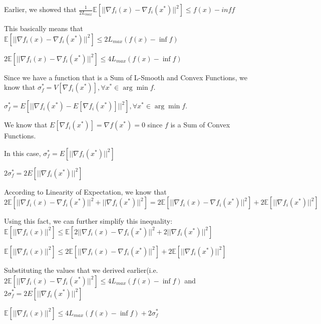 Earlier, we showed that $\frac{1}{2L_{max}} \mathbb{E}[||\nabla f_i(x) - \nabla f_i(x^*)||^2] \leq f(x) - inf f$ \newline 

This basically means that $\mathbb{E}[||\nabla f_i(x) - \nabla f_i(x^*)||^2] \leq 2L_{max} (f(x) - \inf f)$ \newline 

$2\mathbb{E}[||\nabla f_i(x) - \nabla f_i(x^*)||^2] \leq 4L_{max} (f(x) - \inf f)$

Since we have a function that is a Sum of L-Smooth and Convex Functions, we know that \newline 
\noindent $\sigma_f^* = V[\nabla f_i(x^*)], \forall x^* \in \arg \min f.$ \newline 

\noindent $\sigma_f^* = E[||\nabla f_i(x^*) - E[\nabla f_i(x^*)]||^2], \forall x^* \in \arg \min f.$ \newline 

We know that $E[\nabla f_i(x^*)] = \nabla f(x^*) = 0$ since $f$ is a Sum of Convex Functions. \newline 

In this case, 
\noindent $\sigma_f^* = E[||\nabla f_i(x^*)||^2]$ \newline 

$2 \sigma_f^* = 2 E[||\nabla f_i(x^*)||^2]$ \newline 

According to Linearity of Expectation, we know that \newline 
$2\mathbb{E} [||\nabla f_i(x) - \nabla f_i(x^*)||^2 + ||\nabla f_i(x^*)||^2] = 2\mathbb{E} [||\nabla f_i(x) - \nabla f_i(x^*)||^2] + 2 \mathbb{E}  [||\nabla f_i(x^*)||^2]$


Using this fact, we can further simplify this inequality: \noindent $\mathbb{E}[||\nabla f_i(x)||^2] \leq \mathbb{E} [2||\nabla f_i(x) - \nabla f_i(x^*)||^2 + 2||\nabla f_i(x^*)||^2]$ \newline 

\noindent $\mathbb{E}[||\nabla f_i(x)||^2] \leq 2\mathbb{E} [||\nabla f_i(x) - \nabla f_i(x^*)||^2] + 2 \mathbb{E}  [||\nabla f_i(x^*)||^2]$ \newline 

Substituting the values that we derived earlier(i.e. $2\mathbb{E}[||\nabla f_i(x) - \nabla f_i(x^*)||^2] \leq 4L_{max} (f(x) - \inf f)$ and $2 \sigma_f^* = 2 E[||\nabla f_i(x^*)||^2]$ \newline 

\noindent $\mathbb{E}[||\nabla f_i(x)||^2] \leq 4L_{max} (f(x) - \inf f) + 2 \sigma_f^*$